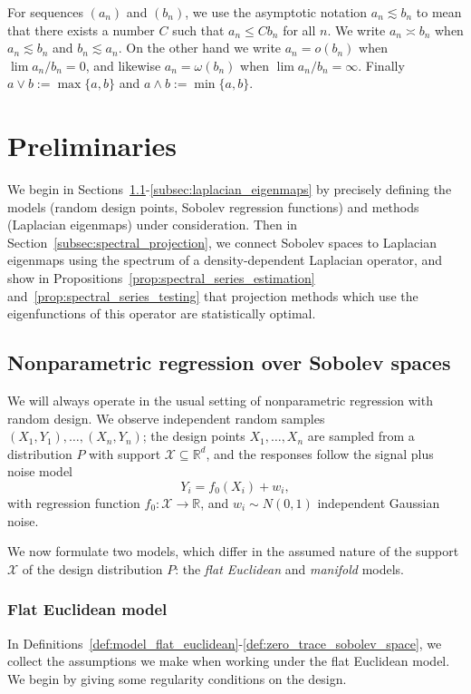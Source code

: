 \documentclass[aos]{imsart}
\theoremstyle{plain}
\theoremstyle{definition}
\theoremstyle{remark}
\def\R{\mathbb{R}}
\newcommand{\mc}[1]{\mathcal{#1}}
\newcommand{\Reals}{\mathbb{R}} %
\newcommand{\Rd}{\Reals^d}
\newcommand{\1}{\mathbf{1}}
\begin{document}
For sequences $(a_n)$ and $(b_n)$, we use the asymptotic notation $a_n \lesssim b_n$ to mean that there exists a number $C$ such that $a_n \leq C b_n$ for all $n$. We write $a_n \asymp b_n$ when $a_n \lesssim b_n$ and $b_n \lesssim a_n$. On the other hand we write $a_n = o(b_n)$ when $\lim a_n/b_n = 0$, and likewise $a_n = \omega(b_n)$ when $\lim a_n/b_n = \infty$. Finally $a \vee b := \max\{a,b\}$ and $a \wedge b := \min\{a,b\}$.

\section{Preliminaries}
\label{sec:setup_main_results}

We begin in Sections~\ref{subsec:regression_laplacian_eigenmaps}-\ref{subsec:laplacian_eigenmaps} by precisely defining the models (random design points, Sobolev regression functions) and methods (Laplacian eigenmaps) under consideration. Then in Section~\ref{subsec:spectral_projection}, we connect Sobolev spaces to Laplacian eigenmaps using the spectrum of a density-dependent Laplacian operator, and show in Propositions~\ref{prop:spectral_series_estimation} and~\ref{prop:spectral_series_testing} that projection methods which use the eigenfunctions of this operator are statistically optimal.

\subsection{Nonparametric regression over Sobolev spaces}
\label{subsec:regression_laplacian_eigenmaps}

We will always operate in the usual setting of nonparametric regression with random design. We observe independent random samples $(X_1,Y_1),\ldots,(X_n,Y_n)$; the design points $X_1,\ldots,X_n$ are sampled from a distribution $P$ with support $\mc{X} \subseteq \Rd$, and the responses follow the signal plus noise model
\begin{equation}
\label{eqn:model}
Y_i = f_0(X_i) + w_i,
\end{equation}
with regression function $f_0: \mc{X} \to \Reals$, and $w_i \sim N(0,1)$ independent Gaussian noise.

We now formulate two models, which differ in the assumed nature of the support $\mc{X}$ of the design distribution $P$: the \emph{flat Euclidean} and \emph{manifold} models.

\subsubsection{Flat Euclidean model}
In Definitions~\ref{def:model_flat_euclidean}-\ref{def:zero_trace_sobolev_space}, we collect the assumptions we make when working under the flat Euclidean model. We begin by giving some regularity conditions on the design.
\end{document}

